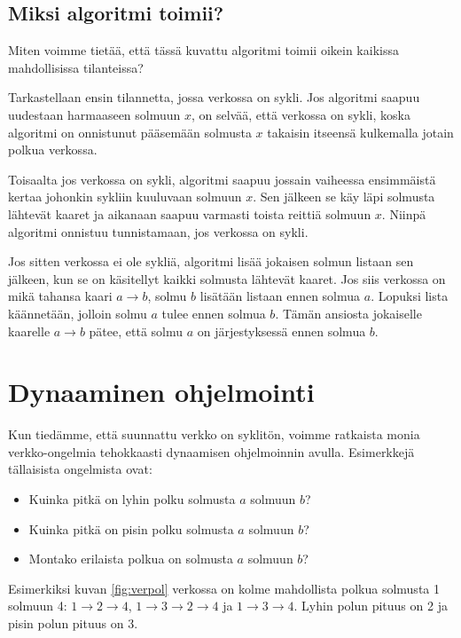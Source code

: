 \subsection{Miksi algoritmi toimii?}

Miten voimme tietää, että tässä kuvattu algoritmi toimii
oikein kaikissa mahdollisissa tilanteissa?

Tarkastellaan ensin tilannetta, jossa verkossa on sykli.
Jos algoritmi saapuu uudestaan harmaaseen solmuun $x$,
on selvää, että verkossa on sykli,
koska algoritmi on onnistunut pääsemään solmusta $x$
takaisin itseensä kulkemalla jotain polkua verkossa.

Toisaalta jos verkossa on sykli, algoritmi saapuu
jossain vaiheessa ensimmäistä kertaa johonkin sykliin
kuuluvaan solmuun $x$. Sen jälkeen se käy läpi solmusta
lähtevät kaaret ja aikanaan saapuu varmasti toista reittiä
solmuun $x$. Niinpä algoritmi onnistuu tunnistamaan,
jos verkossa on sykli.

Jos sitten verkossa ei ole sykliä, algoritmi lisää jokaisen
solmun listaan sen jälkeen, kun se on käsitellyt
kaikki solmusta lähtevät kaaret.
Jos siis verkossa on mikä tahansa kaari $a \rightarrow b$,
solmu $b$ lisätään listaan ennen solmua $a$.
Lopuksi lista käännetään, jolloin solmu $a$
tulee ennen solmua $b$.
Tämän ansiosta jokaiselle kaarelle $a \rightarrow b$ pätee,
että solmu $a$ on järjestyksessä ennen solmua $b$.

\section{Dynaaminen ohjelmointi}

Kun tiedämme, että suunnattu verkko on syklitön,
voimme ratkaista monia verkko-ongelmia tehokkaasti
dynaamisen ohjelmoinnin avulla.
Esimerkkejä tällaisista ongelmista ovat:

\begin{itemize}
\item Kuinka pitkä on lyhin polku solmusta $a$ solmuun $b$?
\item Kuinka pitkä on pisin polku solmusta $a$ solmuun $b$?
\item Montako erilaista polkua on solmusta $a$ solmuun $b$?
\end{itemize}

Esimerkiksi kuvan \ref{fig:verpol} verkossa on kolme
mahdollista polkua solmusta 1 solmuun 4:
$1 \rightarrow 2 \rightarrow 4$,
$1 \rightarrow 3 \rightarrow 2 \rightarrow 4$ ja
$1 \rightarrow 3 \rightarrow 4$.
Lyhin polun pituus on 2 ja pisin polun pituus on 3.

